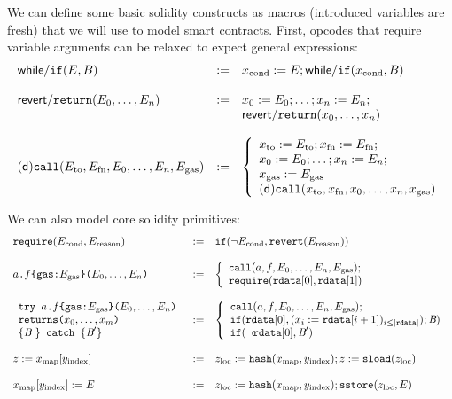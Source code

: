 \documentclass[12pt]{extarticle}
\begin{document}
We can define some basic solidity constructs as macros (introduced variables are fresh) that we will use to model smart contracts.
First, opcodes that require variable arguments can be relaxed to expect general expressions:
$$ \begin{array} {lll}
\mathsf{while}/\mathtt{if}(E,B) &:=& x_\textrm{cond} := E; \mathsf{while}/\mathtt{if}(x_\textrm{cond},B)\\\\
\mathsf{revert}/\mathtt{return}(E_0,\dots,E_n) &:=& x_0:=E_0; \dots; x_n:=E_n;\\
&& \mathsf{revert}/\mathtt{return}(x_0,\dots,x_n)\\\\
\mathsf{(d)}\mathtt{call}(E_\textrm{to},E_{\textrm{fn}},E_0,\dots,E_n,E_{\textrm{gas}}) &:=& \left\{
\begin{array}{l}
x_\textrm{to} := E_\textrm{to};x_\textrm{fn} := E_\textrm{fn}; \\
x_0 := E_0; \dots; x_n := E_n; \\
x_\textrm{gas} := E_\textrm{gas}\\
\mathsf{(d)}\mathtt{call}(x_\textrm{to},x_\textrm{fn},x_0,\dots,x_n,x_\textrm{gas})\\\end{array}\right.
\end{array}
$$

We can also model core solidity primitives:
$$\begin{array}{lll}
\texttt{require}(E_\textrm{cond},E_\textrm{reason}) &:=& \mathtt{if}(\neg E_\textrm{cond},\mathtt{revert}(E_\textrm{reason}))\\\\
\texttt{$a$.$f$\{gas:$E_\textrm{gas}$\}($E_0,\dots,E_n$)} &:=& \left\{
\begin{array}{l}
    \mathtt{call}(a,f,E_0,\dots,E_n,E_\textrm{gas}); \\
    \texttt{require}(\mathtt{rdata}[0],\mathtt{rdata}[1])
\end{array}\right. \\\\
\begin{array}{l}
\texttt{try $a$.$f$\{gas:$E_\textrm{gas}$\}($E_0,\dots,E_n$)}\\
\texttt{returns($x_0,\dots,x_m$)}\\
\{\textit{B}\ \} \texttt{ catch } \{\textit{B}'\} \end{array} &:=& \left\{
    \begin{array}{l}
        \mathtt{call}(a,f,E_0,\dots,E_n,E_\textrm{gas}); \\
        \mathtt{if}(\mathtt{rdata}[0], (x_i:=\mathtt{rdata}[i+1])_{i\leq |\mathtt{rdata}|});\textit{B}) \\
        \mathtt{if}(\neg\mathtt{rdata}[0], \textit{B}')
    \end{array}\right. \\\\
z:=x_{\rm map}[y_{\rm index}] &:=& z_{\rm loc}:=\mathtt{hash}(x_{\rm map},y_{\rm index}); z:=\mathtt{sload}(z_{\rm loc})\\\\
x_{\rm map}[y_{\rm index}]:=E &:=& z_{\rm loc}:=\mathtt{hash}(x_{\rm map},y_{\rm index}); \mathtt{sstore}(z_{\rm loc},E)
\end{array}
$$
\end{document}
